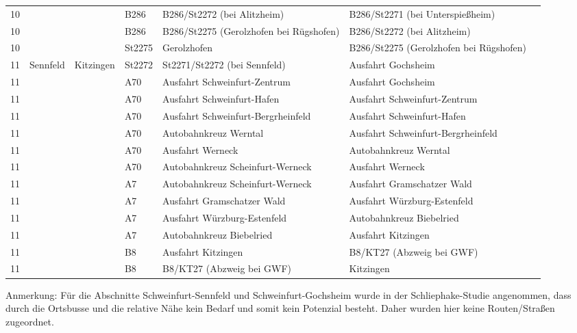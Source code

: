 \begin{tabular}{|l|l|l|l|l|l|l|}
    10 &  &  & B286 & B286/St2272 (bei Alitzheim) & B286/St2271 (bei Unterspießheim)\\ 
    10 &  &  & B286 & B286/St2275 (Gerolzhofen bei Rügshofen) & B286/St2272 (bei Alitzheim)\\ 
    10 &  &  & St2275 & Gerolzhofen & B286/St2275 (Gerolzhofen bei Rügshofen)\\ 
    \hline
    11 & Sennfeld & Kitzingen & St2272 & St2271/St2272 (bei Sennfeld) & Ausfahrt Gochsheim\\ 
    11 &  &  & A70 & Ausfahrt Schweinfurt-Zentrum & Ausfahrt Gochsheim\\ 
    11 &  &  & A70 & Ausfahrt Schweinfurt-Hafen & Ausfahrt Schweinfurt-Zentrum\\ 
    11 &  &  & A70 & Ausfahrt Schweinfurt-Bergrheinfeld & Ausfahrt Schweinfurt-Hafen\\ 
    11 &  &  & A70 & Autobahnkreuz Werntal & Ausfahrt Schweinfurt-Bergrheinfeld\\ 
    11 &  &  & A70 & Ausfahrt Werneck & Autobahnkreuz Werntal\\ 
    11 &  &  & A70 & Autobahnkreuz Scheinfurt-Werneck & Ausfahrt Werneck\\ 
    11 &  &  & A7 & Autobahnkreuz Scheinfurt-Werneck & Ausfahrt Gramschatzer Wald\\ 
    11 &  &  & A7 & Ausfahrt Gramschatzer Wald & Ausfahrt Würzburg-Estenfeld\\ 
    11 &  &  & A7 & Ausfahrt Würzburg-Estenfeld & Autobahnkreuz Biebelried\\ 
    11 &  &  & A7 & Autobahnkreuz Biebelried & Ausfahrt Kitzingen\\ 
    11 &  &  & B8 & Ausfahrt Kitzingen & B8/KT27 (Abzweig bei GWF)\\ 
    11 &  &  & B8 & B8/KT27 (Abzweig bei GWF) & Kitzingen\\ 
    \hline
\end{tabular}
\newline
\newline
Anmerkung: Für die Abschnitte Schweinfurt-Sennfeld und Schweinfurt-Gochsheim wurde in der Schliephake-Studie angenommen, dass durch die Ortsbusse und die relative Nähe kein Bedarf und somit kein Potenzial besteht. Daher wurden hier keine Routen/Straßen zugeordnet.
\newline
